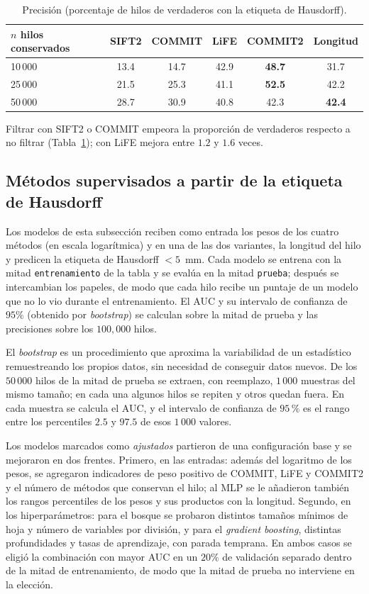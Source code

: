 \documentclass[11pt,a4paper]{article}
\newcommand{\code}[1]{\texttt{\small #1}}
\begin{document}
\begin{table}[H]
\centering
\small
\begin{tabular}{@{}lccccc@{}}
\toprule
$n$ hilos conservados & \textbf{SIFT2} & \textbf{COMMIT} & \textbf{LiFE} & \textbf{COMMIT2} & \textbf{Longitud}\\
\midrule
10\,000 & 13.4 & 14.7 & 42.9 & \textbf{48.7}    & 31.7\\
25\,000 & 21.5 & 25.3 & 41.1 & \textbf{52.5} & 42.2\\
50\,000 & 28.7 & 30.9 & 40.8& 42.3 & \textbf{42.4}\\
\bottomrule
\end{tabular}
\caption{Precisi\'on (porcentaje de hilos de verdaderos con la etiqueta de Hausdorff). }
\label{tab:mismon-haus}
\end{table}

Filtrar con SIFT2 o COMMIT empeora la proporci\'on de verdaderos respecto a no filtrar
(Tabla~\ref{tab:mismon-haus}); con LiFE mejora entre  $1.2$ y $1.6$ veces. 


\subsection{Métodos supervisados a partir de la etiqueta de Hausdorff}
\label{sec:modelos-res}

Los modelos de esta subsección reciben como entrada los pesos de los cuatro métodos (en escala logarítmica) y en una de las dos variantes, la longitud del hilo y predicen la etiqueta de Hausdorff $<5$~mm. Cada modelo se entrena con la mitad \code{entrenamiento} de la tabla y se evalúa en la mitad \code{prueba}; después se intercambian los papeles, de modo que cada hilo recibe un puntaje de un modelo que no lo vio durante el entrenamiento. El AUC y su intervalo de confianza de $95\%$ (obtenido por \textit{bootstrap}) se calculan sobre la mitad de prueba y las precisiones sobre los $100,000$ hilos.

El \textit{bootstrap} es un procedimiento que aproxima la variabilidad de un estadístico remuestreando los propios datos, sin necesidad de conseguir datos nuevos. De los $50\,000$ hilos de la mitad de prueba se extraen, con reemplazo, $1\,000$ muestras del mismo tamaño; en cada una algunos hilos se repiten y otros quedan fuera. En cada muestra se calcula el AUC, y el intervalo de confianza de $95\,\%$ es el rango entre los percentiles $2.5$ y $97.5$ de esos $1\,000$ valores.

Los modelos marcados como \textit{ajustados} partieron de una configuración base y se mejoraron en dos frentes. Primero, en las entradas: además del logaritmo de los pesos, se agregaron indicadores de peso positivo de COMMIT, LiFE y COMMIT2 y el número de métodos que conservan el hilo; al MLP se le añadieron también los rangos percentiles de los pesos y sus productos con la longitud. Segundo, en los hiperparámetros: para el bosque se probaron distintos tamaños mínimos de hoja y número de variables por división, y para el \textit{gradient boosting}, distintas profundidades y tasas de aprendizaje, con parada temprana. En ambos casos se eligió la combinación con mayor AUC en un $20\%$ de validación separado dentro de la mitad de entrenamiento, de modo que la mitad de prueba no interviene en la elección.
\end{document}
